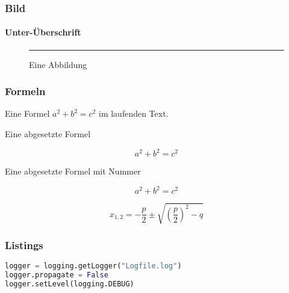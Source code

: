 \documentclass[12pt,ngerman]{beamer}
\begin{document}
\begin{frame}
\frametitle{Bild}
\framesubtitle{Unter-Überschrift}

\begin{center}
\begin{figure}
\rule{\textwidth}{0.5\textwidth}
\caption{Eine Abbildung}
\end{figure}
\end{center}


\end{frame}


\begin{frame}
\frametitle{Formeln}

Eine Formel \(a^2+b^2=c^2\) im laufenden Text.

Eine abgesetzte Formel 

\[a^2+b^2=c^2\]

Eine abgesetzte Formel mit Nummer

\begin{equation}
a^2+b^2=c^2
\end{equation}


\begin{equation}
x_{1, 2} = -\frac{p}{2} \pm \sqrt{ \left(\frac{p}{2}\right)^2 -q }
\end{equation}

\end{frame}

\begin{frame}[containsverbatim] %
\frametitle{Listings}

\begin{lstlisting}[language={Python},caption={Python Code}]
logger = logging.getLogger("Logfile.log")
logger.propagate = False
logger.setLevel(logging.DEBUG)
\end{lstlisting}
\end{frame}
\end{document}
